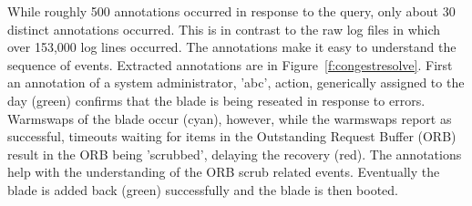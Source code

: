 While roughly 500 annotations occurred in response to the query,
only about 30 distinct annotations occurred. This is in contrast to the raw log files in which over 153,000 log lines occurred.
The annotations make it easy to understand the sequence of events. Extracted annotations are in Figure~\ref{f:congestresolve}.
First an annotation of a system administrator, 'abc', action, generically assigned to the day (green) confirms that the blade is being reseated in response
to errors. Warmswaps of the blade occur (cyan), however, while the warmswaps report as successful, timeouts waiting for items in the Outstanding Request Buffer (ORB)
result in the ORB being 'scrubbed', delaying the recovery (red). The annotations help with the understanding of the ORB scrub related events.
Eventually the blade is added back (green) successfully and the blade is then booted.

